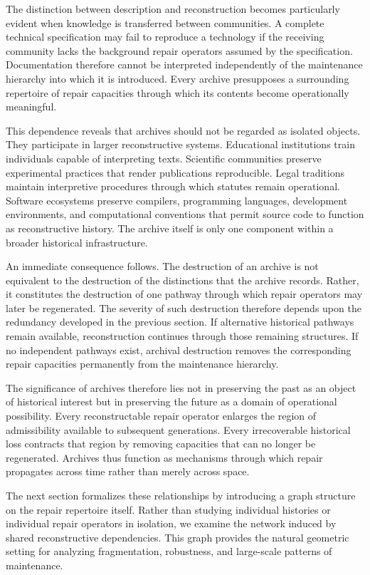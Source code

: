 \documentclass[12pt,oneside]{article}
\theoremstyle{plain}
\theoremstyle{definition}
\theoremstyle{remark}
\theoremstyle{plain}
\begin{document}
The distinction between description and reconstruction becomes particularly evident when knowledge
is transferred between communities. A complete technical specification may fail to reproduce a
technology if the receiving community lacks the background repair operators assumed by the
specification. Documentation therefore cannot be interpreted independently of the maintenance
hierarchy into which it is introduced. Every archive presupposes a surrounding repertoire of repair
capacities through which its contents become operationally meaningful.

This dependence reveals that archives should not be regarded as isolated objects. They participate
in larger reconstructive systems. Educational institutions train individuals capable of interpreting
texts. Scientific communities preserve experimental practices that render publications reproducible.
Legal traditions maintain interpretive procedures through which statutes remain operational.
Software ecosystems preserve compilers, programming languages, development environments, and
computational conventions that permit source code to function as reconstructive history. The archive
itself is only one component within a broader historical infrastructure.

An immediate consequence follows. The destruction of an archive is not equivalent to the
destruction of the distinctions that the archive records. Rather, it constitutes the destruction
of one pathway through which repair operators may later be regenerated. The severity of such
destruction therefore depends upon the redundancy developed in the previous section. If alternative
historical pathways remain available, reconstruction continues through those remaining structures.
If no independent pathways exist, archival destruction removes the corresponding repair capacities
permanently from the maintenance hierarchy.

The significance of archives therefore lies not in preserving the past as an object of historical
interest but in preserving the future as a domain of operational possibility. Every reconstructable
repair operator enlarges the region of admissibility available to subsequent generations. Every
irrecoverable historical loss contracts that region by removing capacities that can no longer be
regenerated. Archives thus function as mechanisms through which repair propagates across time
rather than merely across space.

The next section formalizes these relationships by introducing a graph structure on the repair
repertoire itself. Rather than studying individual histories or individual repair operators in
isolation, we examine the network induced by shared reconstructive dependencies. This graph provides
the natural geometric setting for analyzing fragmentation, robustness, and large-scale patterns of
maintenance.
\end{document}
